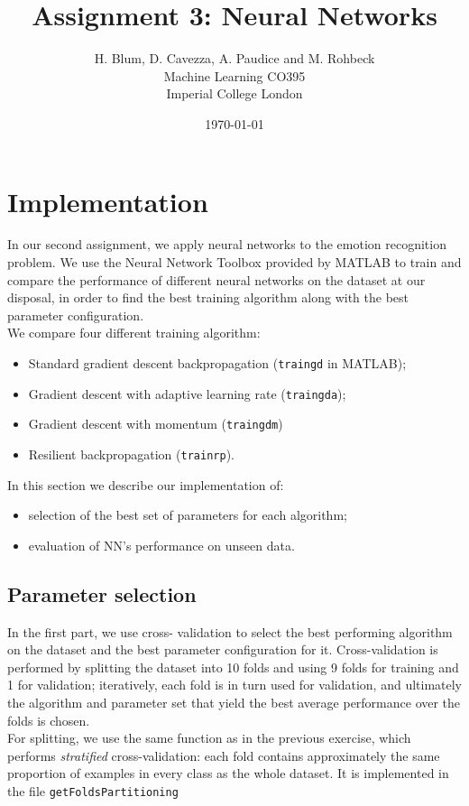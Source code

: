 \documentclass{article}
\begin{document}
\author{H. Blum, D. Cavezza, A. Paudice and M. Rohbeck\\
 Machine Learning CO395\\
  Imperial College London}
\date{\today}
\title{Assignment 3: Neural Networks}
\maketitle

\section{Implementation}
In our second assignment, we apply neural networks to the emotion recognition problem. We use the Neural Network Toolbox provided by MATLAB to train and compare the performance of different neural networks on the dataset at our disposal, in order to find the best training algorithm along with the best parameter configuration.\\
We compare four different training algorithm:
\begin{itemize}
	\item Standard gradient descent backpropagation (\verb$traingd$ in MATLAB);
	\item Gradient descent with adaptive learning rate (\verb$traingda$);
	\item Gradient descent with momentum (\verb$traingdm$)
	\item Resilient backpropagation (\verb$trainrp$).
\end{itemize}
In this section we describe our implementation of:
\begin{itemize}
	\item selection of the best set of parameters for each algorithm;
	\item evaluation of NN's performance on unseen data.
\end{itemize}

\subsection{Parameter selection}
In the first part, we use cross- validation to select the best performing algorithm on the dataset and the best parameter configuration for it. Cross-validation is performed by splitting the dataset into 10 folds and using 9 folds for training and 1 for validation; iteratively, each fold is in turn used for validation, and ultimately the algorithm and parameter set that yield the best average performance over the folds is chosen.\\
For splitting, we use the same function as in the previous exercise, which performs \emph{stratified} cross-validation: each fold contains approximately the same proportion of examples in every class as the whole dataset. It is implemented in the file \verb$getFoldsPartitioning$\\
\end{document}
